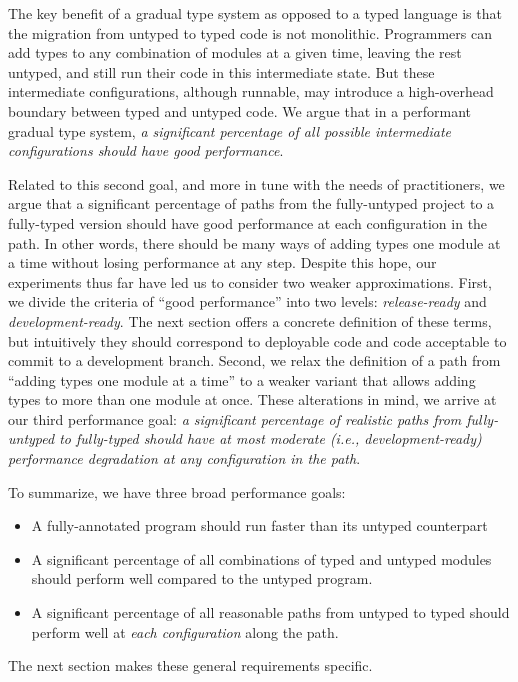 \documentclass{article}
\begin{document}
The key benefit of a gradual type system as opposed to a typed language is that the migration from untyped to typed code is not monolithic.
Programmers can add types to any combination of modules at a given time, leaving the rest untyped, and still run their code in this intermediate state.
But these intermediate configurations, although runnable, may introduce a high-overhead boundary between typed and untyped code.
We argue that in a performant gradual type system, \emph{a significant percentage of all possible intermediate configurations should have good performance}.

Related to this second goal, and more in tune with the needs of practitioners, we argue that a significant percentage of paths from the fully-untyped project to a fully-typed version should have good performance at each configuration in the path.
In other words, there should be many ways of adding types one module at a time without losing performance at any step.
Despite this hope, our experiments thus far have led us to consider two weaker approximations.
First, we divide the criteria of ``good performance'' into two levels: \emph{release-ready} and \emph{development-ready}.
The next section offers a concrete definition of these terms, but intuitively they should correspond to deployable code and code acceptable to commit to a development branch.
Second, we relax the definition of a path from ``adding types one module at a time'' to a weaker variant that allows adding types to more than one module at once.
These alterations in mind, we arrive at our third performance goal: \emph{a significant percentage of realistic paths from fully-untyped to fully-typed should have at most moderate (i.e., development-ready) performance degradation at any configuration in the path}.

To summarize, we have three broad performance goals:
\begin{itemize}
\item A fully-annotated program should run faster than its untyped counterpart
\item A significant percentage of all combinations of typed and untyped modules should perform well compared to the untyped program.
\item A significant percentage of all reasonable paths from untyped to typed should perform well at \emph{each configuration} along the path.
\end{itemize}
The next section makes these general requirements specific.
\end{document}
